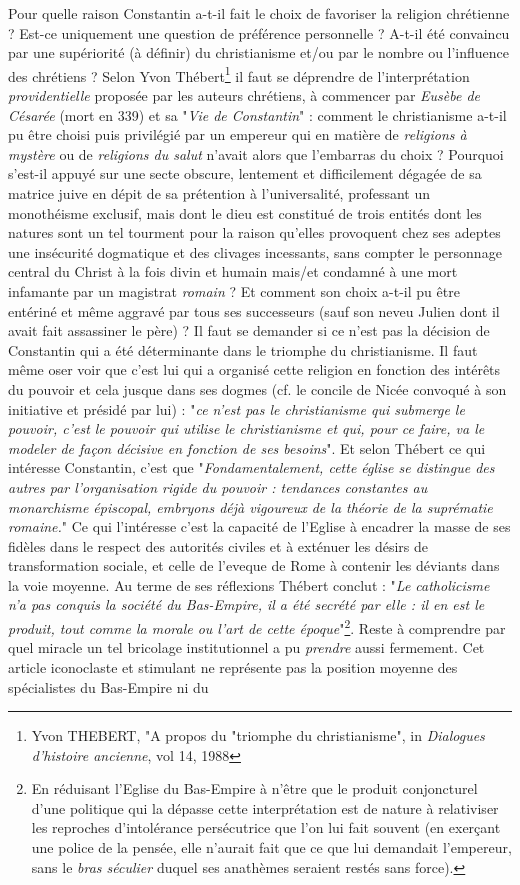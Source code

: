Pour quelle raison Constantin a-t-il fait le choix de favoriser la religion chrétienne ? Est-ce uniquement une question de préférence personnelle ? A-t-il été convaincu par une supériorité (à définir) du christianisme et/ou par le nombre ou l'influence des chrétiens ? 
Selon Yvon Thébert\footnote{Yvon THEBERT, "A propos du "triomphe du christianisme", in \emph{Dialogues d'histoire ancienne}, vol 14, 1988} il faut se déprendre de l'interprétation \emph{providentielle} proposée par les auteurs chrétiens, à commencer par \emph{Eusèbe de Césarée} (mort en 339) et sa "\emph{Vie de Constantin}" : comment le christianisme a-t-il pu être choisi puis privilégié par un empereur qui en matière de \emph{religions à mystère} ou de \emph{religions du salut} n'avait alors que l'embarras du choix ? Pourquoi s'est-il appuyé sur une secte obscure, lentement et difficilement dégagée de sa matrice juive en dépit de sa prétention à l'universalité, professant un monothéisme exclusif, mais dont le dieu est constitué de trois entités dont les natures sont un tel tourment pour la raison qu'elles provoquent chez ses adeptes une insécurité dogmatique et des clivages incessants, sans compter le personnage central du Christ à la fois divin et humain mais/et condamné à une mort infamante par un magistrat \emph{romain} ?  Et comment son choix a-t-il pu être entériné et même aggravé par tous ses successeurs (sauf son neveu Julien dont il avait fait assassiner le père) ? Il faut se demander si ce n'est pas la décision de Constantin qui a été déterminante dans le triomphe du christianisme. Il faut même oser voir que c'est lui qui a organisé cette religion en fonction des intérêts du pouvoir et cela jusque dans ses dogmes (cf. le concile de Nicée convoqué à son initiative et présidé par lui) : "\emph{ce n'est pas le christianisme qui submerge le pouvoir, c'est le pouvoir qui utilise le christianisme et qui, pour ce faire, va le modeler de façon décisive en fonction de ses besoins}". Et selon Thébert ce qui intéresse Constantin, c'est que "\emph{Fondamentalement, cette église se distingue des autres par l'organisation rigide du pouvoir : tendances constantes au monarchisme épiscopal, embryons déjà vigoureux de la théorie de la suprématie romaine.}" Ce qui l'intéresse c'est la capacité de l'Eglise à encadrer la masse de ses fidèles dans le respect des autorités civiles et à exténuer les désirs de transformation sociale, et celle de l'eveque de Rome à contenir les déviants dans la voie moyenne. Au terme de ses réflexions Thébert conclut : "\emph{Le catholicisme n'a pas conquis la société du Bas-Empire, il a été secrété par elle : il en est le produit, tout comme la morale ou l'art de cette époque}"\footnote{En réduisant l'Eglise du Bas-Empire à n'être que le produit conjoncturel d'une politique qui la dépasse cette interprétation est de nature à relativiser les reproches d'intolérance persécutrice que l'on lui fait souvent (en exerçant une police de la pensée, elle n'aurait fait que ce que lui demandait l'empereur, sans le \emph{bras séculier} duquel ses anathèmes seraient restés sans force).}. Reste à comprendre par quel miracle un tel bricolage institutionnel a pu \emph{prendre} aussi fermement. Cet article iconoclaste et stimulant ne représente pas la position moyenne des spécialistes du Bas-Empire ni du 